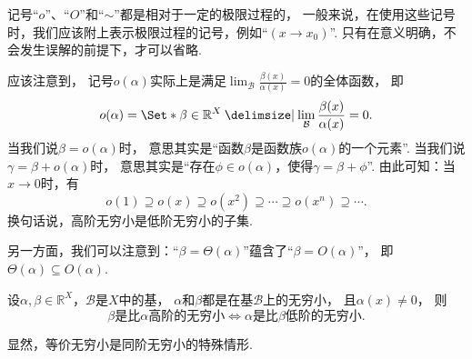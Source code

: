 \begin{remark}
记号“\(o\)”、“\(O\)”和“\(\sim\)”都是相对于一定的极限过程的，
一般来说，在使用这些记号时，我们应该附上表示极限过程的记号，例如“\((x \to x_0)\)”.
只有在意义明确，不会发生误解的前提下，才可以省略.
\end{remark}
\begin{remark}
应该注意到，
记号\(o(\alpha)\)实际上是满足\(\lim_\mathcal{B} \frac{\beta(x)}{\alpha(x)} = 0\)的全体函数，
即\begin{equation*}
	o(\alpha) = \Set*{ \beta\in\mathbb{R}^X \given \lim_\mathcal{B} \frac{\beta(x)}{\alpha(x)} = 0 }.
\end{equation*}
当我们说\(\beta = o(\alpha)\)时，
意思其实是“函数\(\beta\)是函数族\(o(\alpha)\)的一个元素”.
当我们说\(\gamma = \beta + o(\alpha)\)时，
意思其实是“存在\(\phi\in o(\alpha)\)，使得\(\gamma = \beta + \phi\)”.
由此可知：当\(x\to0\)时，有\begin{equation*}
	o(1)
	\supseteq o(x)
	\supseteq o(x^2)
	\supseteq \dotsb
	\supseteq o(x^n)
	\supseteq \dotsb.
\end{equation*}
换句话说，高阶无穷小是低阶无穷小的子集.

另一方面，我们可以注意到：“\(\beta = \Theta(\alpha)\)”蕴含了“\(\beta = O(\alpha)\)”，
即\(\Theta(\alpha) \subseteq O(\alpha)\).
\end{remark}

\begin{proposition}
设\(\alpha,\beta\in\mathbb{R}^X\)，\(\mathcal{B}\)是\(X\)中的基，
\(\alpha\)和\(\beta\)都是在基\(\mathcal{B}\)上的无穷小，
且\(\alpha(x)\neq0\)，
则\begin{equation*}
	\text{\(\beta\)是比\(\alpha\)高阶的无穷小}
	\iff
	\text{\(\alpha\)是比\(\beta\)低阶的无穷小}.
\end{equation*}
\end{proposition}

\begin{remark}
显然，等价无穷小是同阶无穷小的特殊情形.
\end{remark}

